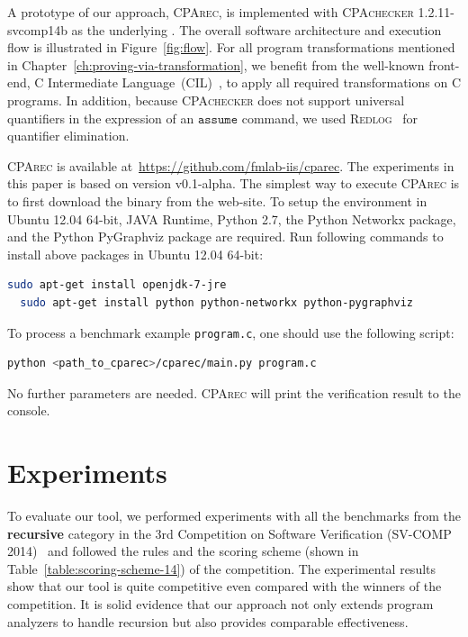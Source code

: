 A prototype of our approach, \textsc{CPArec}, is implemented with
\textsc{CPAchecker} 1.2.11-svcomp14b as the underlying .
The overall software architecture and execution flow is illustrated in
Figure~\ref{fig:flow}.
For all program transformations mentioned in
Chapter~\ref{ch:proving-via-transformation},
we benefit from the well-known front-end,
C Intermediate Language~(\textsc{CIL})~\cite{NeculaMRW02,cil}, to apply all required
transformations on C programs.
In addition, because \textsc{CPAchecker} does not support universal quantifiers
in the expression of an $\mathtt{assume}$ command,
we used \textsc{Redlog}~\cite{Dolzmann97,redlog} for quantifier elimination.

\textsc{CPArec} is available at~\url{https://github.com/fmlab-iis/cparec}.
The experiments in this paper is based on version v0.1-alpha.
The simplest way to execute \textsc{CPArec} is to first download the binary from
the web-site.
To setup the environment in Ubuntu 12.04 64-bit, JAVA Runtime, Python 2.7,
the Python Networkx package, and the Python PyGraphviz package are required.
Run following commands to install above packages in Ubuntu 12.04 64-bit:
\begin{lstlisting}[language=bash]
  sudo apt-get install openjdk-7-jre
  sudo apt-get install python python-networkx python-pygraphviz
\end{lstlisting}
To process a benchmark example \verb|program.c|, one should use the following script:
\begin{lstlisting}[language=bash]
  python <path_to_cparec>/cparec/main.py program.c
\end{lstlisting}
No further parameters are needed.
\textsc{CPArec} will print the verification result to the console. 

\section{Experiments}

To evaluate our tool, we performed experiments with all the benchmarks
from the \textbf{recursive} category in the 3rd Competition on
Software Verification (SV-COMP 2014)~\cite{svcomp14} and followed the
rules and the scoring scheme (shown in Table~\ref{table:scoring-scheme-14})
of the competition.
The experimental results show that our tool is quite competitive even compared
with the winners of the competition.
It is solid evidence that our approach not only extends program analyzers to
handle recursion but also provides comparable effectiveness.

